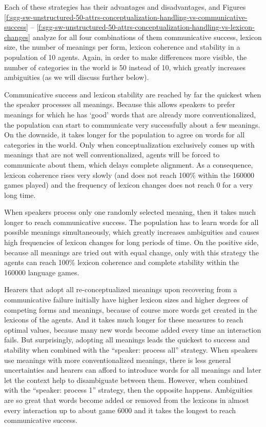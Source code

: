 Each of these strategies has their advantages and disadvantages, and
Figures
\ref{f:sgg-sw-unstructured-50-attrs-conceptualization-handling-vs-communicative-success}
--
\ref{f:sgg-sw-unstructured-50-attrs-conceptualization-handling-vs-lexicon-changes}
analyze for all four combinations of them communicative success,
lexicon size, the number of meanings per form, lexicon coherence and
stability in a population of 10 agents. Again, in order to make
differences more visible, the number of categories in the world is 50
instead of 10, which greatly increases ambiguities (as we will discuss
further below).

Communicative success and lexicon stability are reached by far the
quickest when the speaker processes all meanings. Because this allows
speakers to prefer meanings for which he has `good' words that are
already more conventionalized, the population can start to communicate
very successfully about a few meanings. On the downside, it takes
longer for the population to agree on words for all categories in the
world. Only when conceptualization exclusively comes up with meanings
that are not well conventionalized, agents will be forced to
communicate about them, which delays complete alignment. As a
consequence, lexicon coherence rises very slowly (and does not reach
100\% within the 160000 games played) and the frequency of lexicon
changes does not reach 0 for a very long time.


When speakers process only one randomly selected meaning, then it
takes much longer to reach communicative success. The population has
to learn words for all possible meanings simultaneously, which
greatly increases ambiguities and causes high frequencies of lexicon
changes for long periods of time. On the positive side, because all
meanings are tried out with equal change, only with this strategy the
agents can reach 100\% lexicon coherence and complete stability within
the 160000 language games.


Hearers that adopt all re-conceptualized meanings upon recovering from
a communicative failure initially have higher lexicon sizes and higher
degrees of competing forms and meanings, because of course more words
get created in the lexicons of the agents. And it takes much longer
for these measures to reach optimal values, because many new words
become added every time an interaction fails. But surprisingly,
adopting all meanings leads the quickest to success and stability when
combined with the ``speaker: process all'' strategy. When speakers use
meanings with more conventionalized meanings, there is less general
uncertainties and hearers can afford to introduce words for all
meanings and later let the context help to disambiguate between
them. However, when combined with the ``speaker: process 1'' strategy,
then the opposite happens. Ambiguities are so great that words become
added or removed from the lexicons in almost every interaction up to
about game 6000 and it takes the longest to reach communicative
success.

